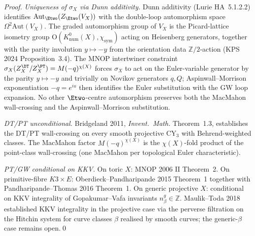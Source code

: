 \begin{proof}
\emph{Uniqueness of $\sigma_X$ via Dunn additivity.} Dunn additivity
(Lurie HA~5.1.2.2) identifies $\mathrm{Aut}_{\Etwo}(Z_{\Etwo}(V_X))$ with
the double-loop automorphism space $\Omega^2\mathrm{Aut}(V_X)$. The
graded automorphism group of $V_X$ is the Picard-lattice isometry group
$\mathrm{O}(K^0_{\mathrm{num}}(X), \chi_{\mathrm{sym}})$ acting on Heisenberg
generators, together with the parity involution $y\mapsto -y$ from the
orientation data $\mathbb{Z}/2$-action (KPS 2024 Proposition~3.4). The
MNOP intertwiner constraint
$\sigma_X(Z^{\DT}_X/Z^{\PT}_X) = M(-q)^{\chi(X)}$ forces $\sigma_X$ to
act on the Euler-variable generator by the parity $y\mapsto -y$ and
trivially on Novikov generators $q, Q$; Aspinwall--Morrison
exponentiation $-q = e^{iu}$ then identifies the Euler substitution with
the GW loop expansion. No other $\Etwo$-centre automorphism preserves
both the MacMahon wall-crossing and the Aspinwall--Morrison substitution.

\emph{DT/PT unconditional.} Bridgeland 2011, \emph{Invent.~Math.} Theorem~1.3,
establishes the DT/PT wall-crossing on every smooth projective CY$_3$ with
Behrend-weighted classes. The MacMahon factor $M(-q)^{\chi(X)}$ is the
$\chi(X)$-fold product of the point-class wall-crossing (one MacMahon
per topological Euler characteristic).

\emph{PT/GW conditional on KKV.} On toric $X$: MNOP 2006 II Theorem~2.
On primitive-fibre $K3\times E$: Oberdieck--Pandharipande 2015 Theorem~1
together with Pandharipande--Thomas 2016 Theorem~1. On generic projective
$X$: conditional on KKV integrality of Gopakumar--Vafa invariants
$n^g_\beta\in\mathbb{Z}$. Maulik--Toda 2018 established KKV integrality
in the projective case via the perverse filtration on the Hitchin system
for curve classes $\beta$ realised by smooth curves; the generic-$\beta$
case remains open.\qed
\end{proof}


